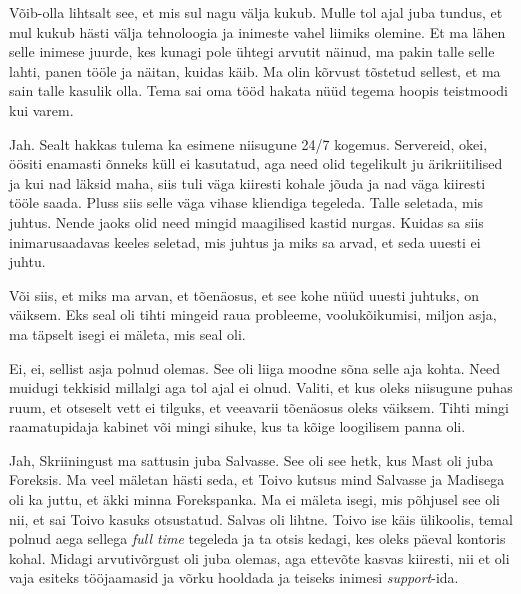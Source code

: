 
Võib-olla lihtsalt see, et mis sul nagu välja kukub. Mulle tol ajal juba 
tundus, et mul kukub hästi välja tehnoloogia ja inimeste vahel  liimiks 
olemine. Et ma lähen selle inimese juurde, kes kunagi pole ühtegi arvutit 
näinud, ma pakin talle selle lahti, panen tööle ja näitan, kuidas käib. Ma 
olin kõrvust tõstetud sellest, et ma sain talle kasulik olla. Tema sai oma tööd 
hakata nüüd tegema hoopis teistmoodi kui varem. 


Jah. Sealt hakkas tulema ka  esimene niisugune 24/7 kogemus. Servereid, okei, 
öösiti enamasti õnneks küll ei kasutatud, aga need olid tegelikult ju 
ärikriitilised ja kui nad läksid maha, siis tuli väga kiiresti kohale jõuda ja 
nad väga kiiresti tööle saada. Pluss siis selle väga vihase kliendiga tegeleda. 
Talle seletada, mis juhtus. Nende jaoks olid need mingid maagilised kastid 
nurgas. Kuidas sa siis inimarusaadavas keeles seletad, mis juhtus ja miks sa 
arvad, et seda uuesti ei juhtu.


Või siis, et miks ma arvan, et tõenäosus, et see kohe nüüd uuesti juhtuks, on 
väiksem. Eks seal oli tihti mingeid raua probleeme, voolukõikumisi, miljon 
asja, ma täpselt isegi ei mäleta, mis seal oli. 


Ei, ei, sellist asja polnud olemas. See oli liiga moodne sõna selle aja kohta. 
Need muidugi tekkisid millalgi aga tol ajal ei olnud. Valiti, et kus oleks 
niisugune puhas ruum, et otseselt vett ei tilguks, et  veeavarii tõenäosus 
oleks väiksem. Tihti mingi raamatupidaja kabinet või mingi sihuke, kus ta kõige 
loogilisem panna oli. 


Jah, Skriiningust ma sattusin juba Salvasse. See oli 
see hetk, kus Mast oli juba 
Foreksis. Ma veel mäletan hästi seda, et 
Toivo kutsus mind Salvasse ja Madisega oli ka juttu, 
et äkki minna Forekspanka. Ma ei mäleta isegi, mis põhjusel see oli nii, et sai 
Toivo kasuks otsustatud. Salvas oli lihtne. Toivo ise käis ülikoolis, temal 
polnud aega sellega \emph{full time} tegeleda ja ta otsis kedagi, kes oleks 
päeval kontoris kohal. Midagi arvutivõrgust oli juba olemas, aga  
ettevõte kasvas  kiiresti, nii et  oli vaja esiteks tööjaamasid ja võrku 
hooldada ja teiseks inimesi \emph{support}-ida. 


